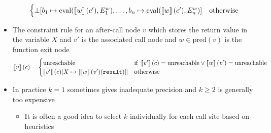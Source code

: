 \begin{itemize}
\begin{equation*}
\begin{cases}
    \bot[b_1 \mapsto \text{eval}(\left\llbracket w\right\rrbracket(c'), E_1^w), \dots, b_n \mapsto \text{eval}(\left\llbracket w\right\rrbracket(c'),E_n^w)] & \text{otherwise}
  \end{cases}
  \end{equation*}
  \item The constraint rule for an after-call node $v$ which stores the return value in the variable $X$ and $v'$ is the associated call node and $w \in \text{pred}(v)$ is the function exit node
  \begin{equation*}
    \left\llbracket v\right\rrbracket(c) = 
    \begin{cases} 
      \text{unreachable} & \text{if } \left\llbracket v'\right\rrbracket(c) = \text{unreachable} \lor \left\llbracket w\right\rrbracket(v') = \text{unreachable} \\
      \left\llbracket v'\right\rrbracket(c)[X \mapsto [\left\llbracket w\right\rrbracket(v')(\mathtt{result})]] & \text{otherwise}
    \end{cases}
  \end{equation*}
  \item In practice $k = 1$ sometimes gives inadequate precision and $k \geq 2$ is generally too expensive
  \begin{itemize}
  	\item It is often a good idea to select $k$ individually for each call site based on heuristics 
  \end{itemize}
  
\end{itemize}

